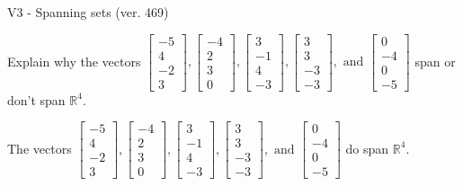 \begin{exercise}
  \begin{exerciseTitle}V3 - Spanning sets (ver. 469)\end{exerciseTitle}
  \begin{exerciseStatement}
    Explain why the vectors \(\left[\begin{array}{r}
-5 \\
4 \\
-2 \\
3
\end{array}\right] , \left[\begin{array}{r}
-4 \\
2 \\
3 \\
0
\end{array}\right] , \left[\begin{array}{r}
3 \\
-1 \\
4 \\
-3
\end{array}\right] , \left[\begin{array}{r}
3 \\
3 \\
-3 \\
-3
\end{array}\right] , \text{ and } \left[\begin{array}{r}
0 \\
-4 \\
0 \\
-5
\end{array}\right]\) span or don't span \(\mathbb{R}^4\). 
	


  \end{exerciseStatement}
  \begin{exerciseAnswer}
   The vectors \(\left[\begin{array}{r}
-5 \\
4 \\
-2 \\
3
\end{array}\right] , \left[\begin{array}{r}
-4 \\
2 \\
3 \\
0
\end{array}\right] , \left[\begin{array}{r}
3 \\
-1 \\
4 \\
-3
\end{array}\right] , \left[\begin{array}{r}
3 \\
3 \\
-3 \\
-3
\end{array}\right] , \text{ and } \left[\begin{array}{r}
0 \\
-4 \\
0 \\
-5
\end{array}\right]\) 
  	 do  
	span \(\mathbb{R}^4\).
  



\end{exerciseAnswer}
\end{exercise}
